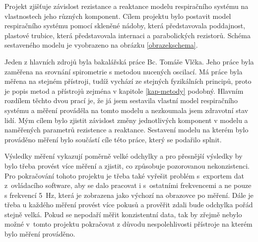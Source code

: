 Projekt zjišťuje závislost rezistance a reaktance modelu respiračního systému na vlastnostech jeho různých komponent. 
Cílem projektu bylo postavit model respiračního systému pomocí skleněné nádoby, která představovala poddajnost, plastové trubice, která představovala internaci a parabolických rezistorů.  Schéma sestaveného modelu je vyobrazeno na obrázku \ref{obrazekschema}. 

Jeden z hlavních zdrojů byla bakalářská práce Bc. Tomáše Vlčka. \cite{Vlcek2018} Jeho práce byla zaměřena na srovnání spirometrie s metodou nucených oscilací. Má práce byla měřena na stejném přístroji, tudíž vychází ze stejných fyzikálních principů, proto je popis metod a přístrojů zejména v kapitole \ref{kap-metody} podobný. Hlavním rozdílem těchto dvou prací je, že já jsem sestavila vlastní model respiračního systému a měření prováděla na tomto modelu a nezkoumala jsem zdravotní stav lidí. Mým cílem bylo zjistit závislost změny jednotlivých komponent v modelu a naměřených parametrů rezistence a reaktance. Sestavení modelu na kterém bylo prováděno měření bylo součástí cíle této práce, který se podařilo splnit. 

Výsledky měření vykazují poměrně velké odchylky a pro přesnější výsledky by bylo třeba provést více měření a zjistit, co způsobuje pozorovanou nekonzistenci. Pro pokračování tohoto projektu je třeba také vyřešit problém s~exportem dat z~ovládacího software, aby se dalo pracovat i s~ostatními frekvencemi a ne pouze s frekvencí \SI{5}{Hz}, která je zobrazena jako výchozí na obrazovce po měření. Dále je třeba u každého měření provést více pokusů a prověřit zdali bude odchylka pořád stejně velká. 
Pokud se nepodaří měřit konzistentní data, tak by zřejmě nebylo možné v~tomto projektu pokračovat z důvodu nespolehlivosti přístroje na kterém bylo měření prováděno. 
